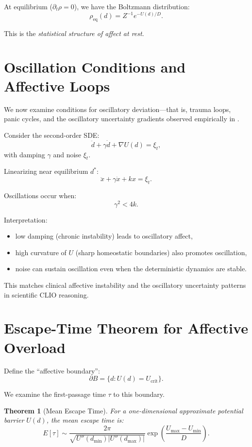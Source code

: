 \documentclass[12pt,oneside]{book}
\theoremstyle{plain}
\newtheorem{theorem}{Theorem}[chapter]
\theoremstyle{definition}
\def\mathbb#1{#1}%
\begin{document}
At equilibrium ($\partial_t \rho = 0$), we have the Boltzmann distribution:
\begin{equation}
\rho_{\mathrm{eq}}(d)
=
Z^{-1} e^{-U(d)/D}.
\end{equation}

This is the \emph{statistical structure of affect at rest}.

\section{Oscillation Conditions and Affective Loops}

We now examine conditions for oscillatory deviation—that is, trauma loops,
panic cycles, and the oscillatory uncertainty gradients observed empirically
in \cite{Cheng2025CognitiveLV}.

Consider the second-order SDE:
\[
\ddot d + \gamma \dot d + \nabla U(d) = \xi_t,
\]
with damping $\gamma$ and noise $\xi_t$.

Linearizing near equilibrium $d^\ast$:
\[
\ddot x + \gamma \dot x + k x = \xi_t.
\]

Oscillations occur when:
\[
\gamma^2 < 4k.
\]

Interpretation:

\begin{itemize}
    \item low damping (chronic instability) leads to oscillatory affect,
    \item high curvature of $U$ (sharp homeostatic boundaries) also promotes oscillation,
    \item noise can sustain oscillation even when the deterministic dynamics are stable.
\end{itemize}

This matches clinical affective instability and the oscillatory uncertainty
patterns in scientific CLIO reasoning.

\section{Escape-Time Theorem for Affective Overload}

Define the ``affective boundary'':
\[
\partial B = \{ d : U(d) = U_{\mathrm{crit}} \}.
\]

We examine the first-passage time $\tau$ to this boundary.

\begin{theorem}[Mean Escape Time]
For a one-dimensional approximate potential barrier $U(d)$,
the mean escape time is:
\[
\mathbb{E}[\tau]
\sim
\frac{2\pi}{\sqrt{U''(d_\text{min}) |U''(d_\text{max})|}}
\exp\!\left(\frac{U_\text{max} - U_\text{min}}{D}\right).
\]
\end{theorem}
\end{document}
